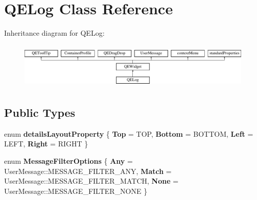 \hypertarget{classQELog}{
\section{QELog Class Reference}
\label{classQELog}
}
Inheritance diagram for QELog:\begin{figure}[H]
\begin{center}
\leavevmode
\includegraphics[height=2.204725cm]{classQELog}
\end{center}
\end{figure}
\subsection*{Public Types}
\begin{DoxyCompactItemize}
\item 
enum {\bfseries detailsLayoutProperty} \{ {\bfseries Top} =  TOP, 
{\bfseries Bottom} =  BOTTOM, 
{\bfseries Left} =  LEFT, 
{\bfseries Right} =  RIGHT
 \}
\item 
enum {\bfseries MessageFilterOptions} \{ {\bfseries Any} =  UserMessage::MESSAGE\_\-FILTER\_\-ANY, 
{\bfseries Match} =  UserMessage::MESSAGE\_\-FILTER\_\-MATCH, 
{\bfseries None} =  UserMessage::MESSAGE\_\-FILTER\_\-NONE
 \}
\end{DoxyCompactItemize}
